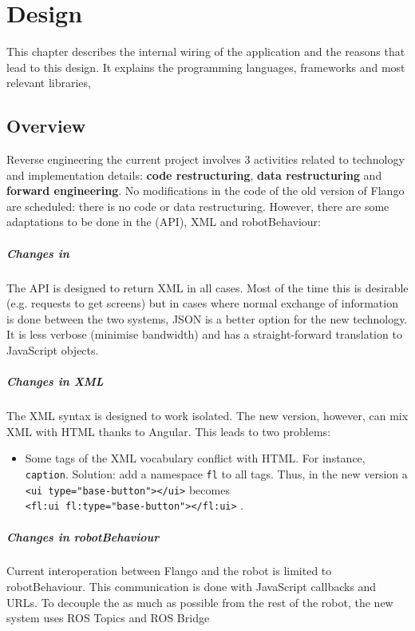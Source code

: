 \chapter{Design}
\label{chap:design}
This chapter describes the internal wiring of the application and the reasons that lead to this design.
It explains the programming languages, frameworks and most relevant libraries, 

\section{Overview}
Reverse engineering the current project involves 3 activities related to technology and implementation details: \textbf{code restructuring}, \textbf{data restructuring} and\textbf{ forward engineering}.
No modifications in the code of the old version of Flango \cm are scheduled: there is no code or data restructuring.
However, there are some adaptations to be done in the \flangobe (\ac{API}), \ac{XML} and robotBehaviour:

\paragraph{Changes in \flangobe} The \ac{API} is designed to return \ac{XML} in all cases.
Most of the time this is desirable (e.g. requests to get screens) but in cases where normal exchange of information is done between the two systems, \ac{JSON} is a better option for the new technology.
It is less verbose (minimise bandwidth) and has a straight-forward translation to JavaScript objects.

\paragraph{Changes in \ac{XML}} The \ac{XML} syntax is designed to work isolated.
The new version, however, can mix \ac{XML} with \ac{HTML} thanks to Angular.
This leads to two problems:
\begin{itemize}
\item Some tags of the \ac{XML} vocabulary conflict with \ac{HTML}. For instance, \texttt{caption}. Solution: add a namespace \texttt{fl} to all tags. Thus, in the new version a \\ \lstinline$<ui type="base-button"></ui>$  becomes\\ \lstinline$<fl:ui fl:type="base-button"></fl:ui>$ .
\end{itemize}

\paragraph{Changes in robotBehaviour} Current interoperation between Flango \cm and the robot is limited to robotBehaviour.
This communication is done with JavaScript callbacks and \acp{URL}.
To decouple the \cm as much as possible from the rest of the robot, the new system uses \ac{ROS} Topics and ROS Bridge

